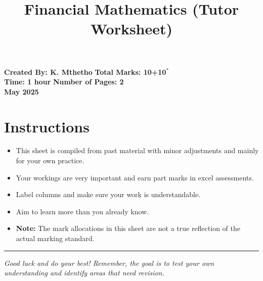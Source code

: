 \documentclass[a4paper,12pt]{article}
\title{\textbf{Financial Mathematics (Tutor Worksheet)}}
\author{}
\date{}
\begin{document}
\maketitle

\vspace{-0.5cm}
\noindent \textbf{Created By: K. Mthetho} \hfill \textbf{Total Marks: 10+10\(^{*}\)} \\
\textbf{Time: 1 hour} \hfill \textbf{Number of Pages: 2} \\
\textbf{May 2025} \hfill 

\vspace{0.5cm}

\section*{Instructions}

\begin{itemize}
    \item This sheet is compiled from past material with minor adjustments and mainly for your own practice. 
    \item Your workings are very important and earn part marks in excel assessments.
    \item Label columns and make sure your work is understandable.
    \item Aim to learn more than you already know.
    \item \textbf{Note:} The mark allocations in this sheet are not a true reflection of the actual marking standard.
\end{itemize}

\vfill

\noindent\rule{\textwidth}{0.4pt}
\begin{center}
\textit{Good luck and do your best! Remember, the goal is to test your own understanding and identify areas that need revision.}
\end{center}

\newpage
\end{document}
